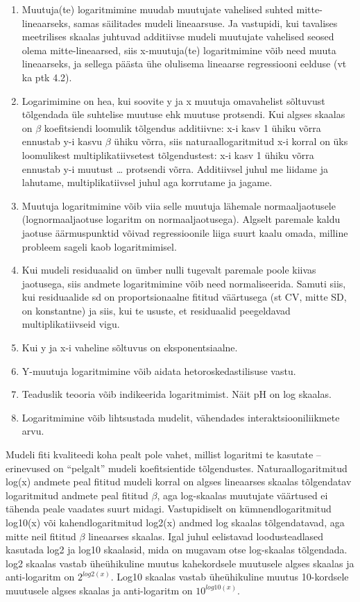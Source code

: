 \documentclass[]{book}
\begin{document}
\begin{enumerate}
\def\labelenumi{\arabic{enumi}.}
\item
  Muutuja(te) logaritmimine muudab muutujate vahelised suhted mitte-lineaarseks, samas säilitades mudeli lineaarsuse. Ja vastupidi, kui tavalises meetrilises skaalas juhtuvad additiivse mudeli muutujate vahelised seosed olema mitte-lineaarsed, siis x-muutuja(te) logaritmimine võib need muuta lineaarseks, ja sellega päästa ühe olulisema lineaarse regressiooni eelduse (vt ka ptk 4.2).
\item
  Logarimimine on hea, kui soovite y ja x muutuja omavahelist sõltuvust tõlgendada üle suhtelise muutuse ehk muutuse protsendi. Kui algses skaalas on \(\beta\) koefitsiendi loomulik tõlgendus additiivne: x-i kasv 1 ühiku võrra ennustab y-i kasvu \(\beta\) ühiku võrra, siis naturaallogaritmitud x-i korral on üks loomulikest multiplikatiivsetest tõlgendustest: x-i kasv 1 ühiku võrra ennustab y-i muutust \ldots{} protsendi võrra. Additiivsel juhul me liidame ja lahutame, multiplikatiivsel juhul aga korrutame ja jagame.
\item
  Muutuja logaritmimine võib viia selle muutuja lähemale normaaljaotusele (lognormaaljaotuse logaritm on normaaljaotusega). Algselt paremale kaldu jaotuse äärmuspunktid võivad regressioonile liiga suurt kaalu omada, milline probleem sageli kaob logaritmimisel.
\item
  Kui mudeli residuaalid on ümber nulli tugevalt paremale poole kiivas jaotusega, siis andmete logaritmimine võib need normaliseerida. Samuti siis, kui residuaalide sd on proportsionaalne fititud väärtusega (st CV, mitte SD, on konstantne) ja siis, kui te ususte, et residuaalid peegeldavad multiplikatiivseid vigu.
\item
  Kui y ja x-i vaheline sõltuvus on eksponentsiaalne.
\item
  Y-muutuja logaritmimine võib aidata hetoroskedastilisuse vastu.
\item
  Teaduslik teooria võib indikeerida logaritmimist. Näit pH on log skaalas.
\item
  Logaritmimine võib lihtsustada mudelit, vähendades interaktsiooniliikmete arvu.
\end{enumerate}

Mudeli fiti kvaliteedi koha pealt pole vahet, millist logaritmi te kasutate -- erinevused on ``pelgalt'' mudeli koefitsientide tõlgendustes.
Naturaallogaritmitud log(x) andmete peal fititud mudeli korral on algses lineaarses skaalas tõlgendatav logaritmitud andmete peal fititud \(\beta\), aga log-skaalas muutujate väärtused ei tähenda peale vaadates suurt midagi. Vastupidiselt on kümnendlogaritmitud log10(x) või kahendlogaritmitud log2(x) andmed log skaalas tõlgendatavad, aga mitte neil fititud \(\beta\) lineaarses skaalas. Igal juhul eelistavad loodusteadlased kasutada log2 ja log10 skaalasid, mida on mugavam otse log-skaalas tõlgendada. log2 skaalas vastab üheühikuline muutus kahekordsele muutusele algses skaalas ja anti-logaritm on \(2^{log2(x)}\). Log10 skaalas vastab üheühikuline muutus 10-kordsele muutusele algses skaalas ja anti-logaritm on \(10^{log10(x)}\).
\end{document}
